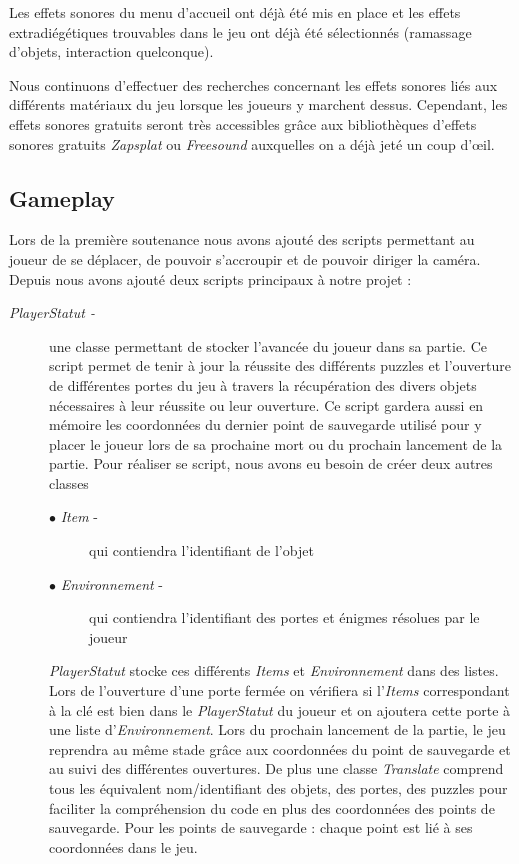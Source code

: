 Les effets sonores du menu d’accueil ont déjà été mis en place et les effets extradiégétiques trouvables dans le jeu ont déjà été sélectionnés (ramassage d’objets, interaction quelconque).

Nous continuons d’effectuer des recherches concernant les effets sonores liés aux différents matériaux du jeu lorsque les joueurs y marchent dessus. Cependant, les effets sonores gratuits seront très accessibles grâce aux bibliothèques d’effets sonores gratuits \emph{Zapsplat} ou \emph{Freesound} auxquelles on a déjà jeté un coup d’œil. 


\subsection{Gameplay}
\setlength{\parindent}{5ex}
Lors de la première soutenance nous avons ajouté des scripts permettant au joueur de se déplacer, de pouvoir s’accroupir et de pouvoir diriger la caméra.
\newline
Depuis nous avons ajouté deux scripts principaux à notre projet :
\begin{description}
  \item[\emph{PlayerStatut -}] une classe permettant de stocker l’avancée du joueur dans sa partie. Ce script permet de tenir à jour la réussite des différents puzzles et l’ouverture de différentes portes du jeu à travers la récupération des divers objets nécessaires à leur réussite ou leur ouverture. Ce script gardera aussi en mémoire les coordonnées du dernier point de sauvegarde utilisé pour y placer le joueur lors de sa prochaine mort ou du prochain lancement de la partie.
  Pour réaliser se script, nous avons eu besoin de créer deux autres classes
  \begin{description}
    \item[$\bullet$ \emph{Item} -] qui contiendra l’identifiant de l’objet
    \item[$\bullet$ \emph{Environnement} -] qui contiendra l’identifiant des portes et énigmes résolues par le joueur
\end{description}
\emph{PlayerStatut} stocke ces différents \emph{Items} et \emph{Environnement} dans des listes.
Lors de l’ouverture d’une porte fermée on vérifiera si l’\emph{Items} correspondant à la clé est bien dans le \emph{PlayerStatut} du joueur et on ajoutera cette porte à une liste d’\emph{Environnement}. Lors du prochain lancement de la partie, le jeu reprendra au même stade grâce aux coordonnées du point de sauvegarde et au suivi des différentes ouvertures.
De plus une classe \emph{Translate} comprend tous les équivalent nom/identifiant des objets, des portes, des puzzles pour faciliter la compréhension du code en plus des coordonnées des points de sauvegarde.
Pour les points de sauvegarde : chaque point est lié à ses coordonnées dans le jeu.
\end{description}

